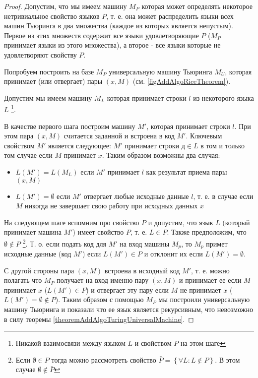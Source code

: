 \begin{proof}
Допустим, что мы имеем машину $M_P$ которая может определять
некоторое нетривиальное свойство языков $P$, т. е. она может
распределить языки всех 
машин Тьюринга в два множества (каждое из которых является непустым). 
Первое из этих множеств содержит все языки удовлетворяющие $P$ ($M_P$
принимает языки из этого множества), а второе - все языки которые не
удовлетворяют свойству $P$. 



Попробуем построить на базе $M_P$ универсальную машину Тьюринга $M_U$,
которая принимает (или отвергает) пары $\left(x, M\right)$ 
(см. \autoref{figAddAlgoRiceTheorem}).

Допустим мы имеем машину $M_L$ которая принимает строки $l$ из
некоторого языка $L$
\footnote{Никакой взаимосвязи между языком $L$ и свойством $P$ на этом шаге}.

В качестве первого шага построим машину $M'$, которая принимает строки
$l$. При этом пара $\left(x, M\right)$ считается заданной и встроена в
код $M'$. Ключевым свойством $M'$ является следующее: $M'$ принимает
строки $д \in L$ в том и только том случае если $M$ 
принимает $x$. Таким образом возможны два случая:
\begin{itemize}
\item $L(M') = L(M_L)$ если $M'$ принимает $l$ как результат приема
  пары $\left(x, M\right)$ 
\item $L(M') = \emptyset$ если $M'$ отвергает любые исходные данные
  $l$,
т. е. в случае если $M$ никогда не завершает свою работу при исходных
данных $x$ 
\end{itemize}

На следующем шаге вспомним про свойство $P$ и допустим, что язык $L$
(который принимает машина $M'$) имеет свойство $P$, т. е. $L \in
P$. Также предположим, что $\emptyset \notin P$
\footnote{
Если $\emptyset \in P$ тогда можно рассмотреть свойство 
$\bar{P} = \left\{\forall L: L \notin P\right\}$. В этом случае
$\emptyset \notin \bar{P}$
}. 
Т. о. если подать код
для $M'$ на вход машины $M_p$, то $M_p$ примет исходные данные (код
$M'$) если $L(M') \in P$ и отклонит их если $L(M') = \emptyset$.

С другой стороны пара $\left(x, M\right)$ встроена в исходный код
$M'$, т. е. можно полагать что $M_P$ получает на вход именно пару 
$\left(x, M\right)$ и принимает ее если $M$ принимает $x$
($L\left(M'\right) \in P$) и отвергает
эту пару если $M$ не принимает $x$ 
($L\left(M'\right) = \emptyset \notin P$). Таким образом с помощью
$M_P$ мы построили универсальную машину Тьюринга и показали что ее
язык является рекурсивным, что невозможно в силу теоремы 
\ref{theoremAddAlgoTuringUniversalMachine}.
\end{proof}

